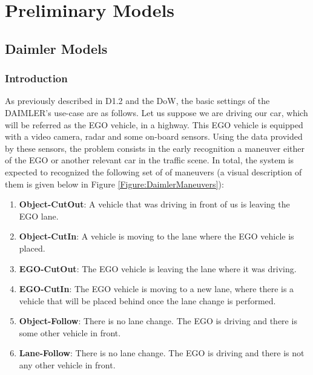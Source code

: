 \section{Preliminary Models}
\subsection{Daimler Models}

\subsubsection*{Introduction}

As previously described in D1.2 and the DoW, the basic settings of the DAIMLER's use-case are as follows. Let us suppose we are driving our car, which will be referred as the EGO vehicle, in a highway. This EGO vehicle is equipped with a video camera, radar and some on-board sensors.  Using the data provided by these sensors, the problem consists in the early recognition a maneuver either of the EGO or another relevant car in the traffic scene. In total, the system is expected to recognized the following set of of maneuvers (a visual description of them is given below in Figure \ref{Figure:DaimlerManeuvers}):
\begin{enumerate}

\item \textbf{Object-CutOut}:  A vehicle that was driving in front of us is leaving the EGO lane.
\item \textbf{Object-CutIn}: A vehicle is moving to the lane where the EGO vehicle is placed.
\item \textbf{EGO-CutOut}: The EGO vehicle is leaving the lane where it was driving.
\item \textbf{EGO-CutIn}: The EGO vehicle is moving to a new lane, where there is a vehicle that will be placed behind once the lane change is performed. 
\item \textbf{Object-Follow}: There is no lane change. The EGO is driving and there is some other vehicle in front.
\item \textbf{Lane-Follow}: There is no lane change. The EGO is driving and there is not any other vehicle in front.
\end{enumerate}

